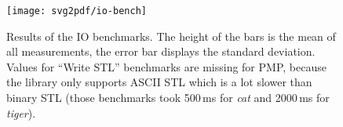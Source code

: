 \begin{figure}[p]
  \centering
  \centerline{
    \texttt{[image: svg2pdf/io-bench]}
  }
  \vspace{1cm}
  \caption{
    Results of the IO benchmarks.
    The height of the bars is the mean of all measurements, the error bar displays the standard deviation.
    Values for \enquote{Write STL} benchmarks are missing for PMP, because the library only supports ASCII STL which is a lot slower than binary STL (those benchmarks took 500\,ms for \emph{cat} and 2000\,ms for \emph{tiger}).
  }
  \label{fig:io-benchmark}
\end{figure}
